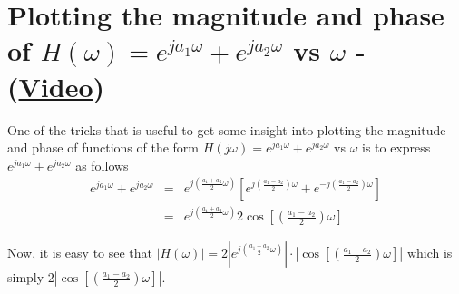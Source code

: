 \section{Plotting the magnitude and phase of $H(\omega) = e^{j a_1 \omega} + e^{j a_2 \omega}$ vs $\omega$ - (\href{https://youtu.be/Vse3mWToWc4}{Video})}
One of the tricks that is useful to get some insight into plotting the magnitude and phase of functions of the form $H(j \omega) = e^{j a_1 \omega} + e^{j a_2 \omega}$ vs $\omega$ is to express $e^{j a_1 \omega} + e^{j a_2 \omega}$ as follows
\begin{eqnarray}
\label{eq:sumofsinusoids}
e^{j a_1 \omega} + e^{j a_2 \omega} & = & e^{j \left(\frac{a_1+a_2}{2} \omega \right)} \left[ e^{j \left(\frac{a_1-a_2}{2} \right)\omega} + e^{-j \left( \frac{a_1-a_2}{2}\right) \omega } \right] \\
\nonumber
& = & e^{j \left(\frac{a_1+a_2}{2} \omega \right)} 2 \cos \left[ \left( \frac{a_1 - a_2}{2} \right) \omega \right]
\end{eqnarray}

Now, it is easy to see that $|H(\omega)| = 2 \left| e^{j \left(\frac{a_1+a_2}{2} \omega \right)}\right| \cdot \left| \cos \left[ \left( \frac{a_1 - a_2}{2} \right) \omega \right] \right| $ which is simply $2 \left| \cos \left[ \left( \frac{a_1 - a_2}{2} \right) \omega \right] \right|$.

